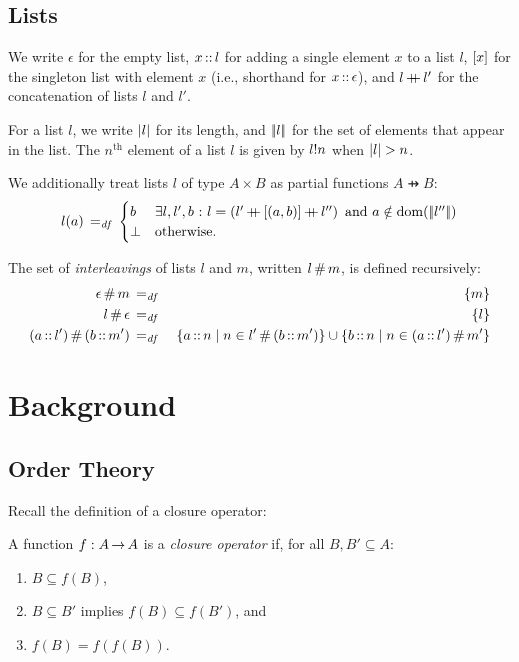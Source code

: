 \documentclass[11pt]{report}
\begin{document}

\section{Lists} %
\label{sec:lists}

We write $\epsilon$ for the empty list, $x \lcons l$ for adding a single element $x$ to a list $l$, $\lsingle{x}$ for the singleton list with element $x$ (i.e., shorthand for $x \lcons \epsilon$), and $l \lapp l'$ for the concatenation of lists $l$ and $l'$. 

For a list $l$, we write $\llen{l}$ for its length, and $\elems{l}$ for the set of elements that appear in the list. The $n^{\text{th}}$ element of a list $l$ is given by $\nth{n}{l}$ when $\llen{l} > n$. 

We additionally treat lists $l$ of type $A \times B$ as partial functions $A \pfun B$: \[ l(a) \eqdef \begin{cases}
	b & \text{$\exists l,l',b \st l = \left(l' \lapp \lsingle{(a,b)} \lapp l''\right) \text{ and }a \notin \dom{\elems{l''}}$} \\
	\bot & \text{otherwise.}
\end{cases}\] 

The set of \emph{interleavings} of lists $l$ and $m$, written $l \merge m$, is defined recursively: \begin{eqnarray*}
	\epsilon \merge m & \eqdef & \set{m} \\
	l \merge \epsilon & \eqdef & \set{l} \\
	(a \lcons l') \merge (b \lcons m') & \eqdef & \setof{a \lcons n}{n \in l' \merge (b \lcons m')} \cup \setof{b \lcons n}{n \in (a \lcons l') \merge m'}\\
\end{eqnarray*}


\chapter{Background} %
\label{cha:background}


\section{Order Theory} %
\label{sec:order-theory}

Recall the definition of a closure operator: 
\begin{definition} 
\label{def:closure}
A function $f : A \tfun A$ is a \emph{closure
  operator} if, for all $B,B' \subseteq A$:
\begin{enumerate}
\item $B \subseteq f(B)$,
\item $B \subseteq B'$ implies $f(B) \subseteq f(B')$, and
\item $f(B) = f(f(B))$.
\end{enumerate}
\end{definition}
\end{document}
